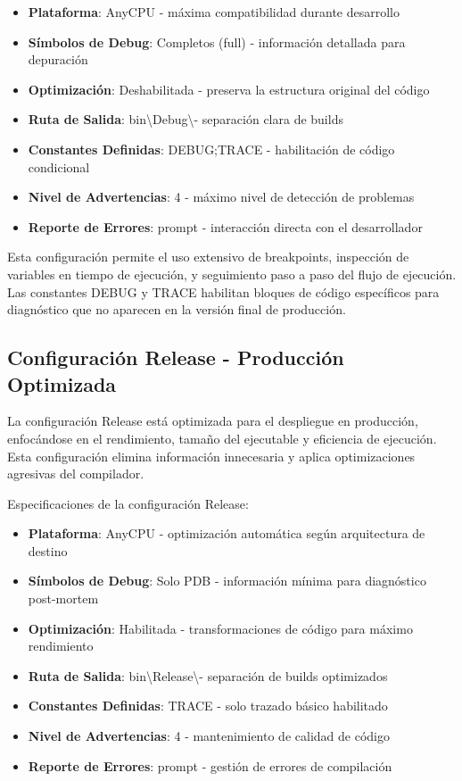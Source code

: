 \documentclass[a4paper]{article}
\begin{document}
\begin{itemize}
\item \textbf{Plataforma}: AnyCPU - máxima compatibilidad durante desarrollo
\item \textbf{Símbolos de Debug}: Completos (full) - información detallada para depuración
\item \textbf{Optimización}: Deshabilitada - preserva la estructura original del código
\item \textbf{Ruta de Salida}: bin\textbackslash Debug\textbackslash - separación clara de builds
\item \textbf{Constantes Definidas}: DEBUG;TRACE - habilitación de código condicional
\item \textbf{Nivel de Advertencias}: 4 - máximo nivel de detección de problemas
\item \textbf{Reporte de Errores}: prompt - interacción directa con el desarrollador
\end{itemize}

Esta configuración permite el uso extensivo de breakpoints, inspección de variables en tiempo de ejecución, y seguimiento paso a paso del flujo de ejecución. Las constantes DEBUG y TRACE habilitan bloques de código específicos para diagnóstico que no aparecen en la versión final de producción.

\subsection{Configuración Release - Producción Optimizada}

La configuración Release está optimizada para el despliegue en producción, enfocándose en el rendimiento, tamaño del ejecutable y eficiencia de ejecución. Esta configuración elimina información innecesaria y aplica optimizaciones agresivas del compilador.

Especificaciones de la configuración Release:

\begin{itemize}
\item \textbf{Plataforma}: AnyCPU - optimización automática según arquitectura de destino
\item \textbf{Símbolos de Debug}: Solo PDB - información mínima para diagnóstico post-mortem
\item \textbf{Optimización}: Habilitada - transformaciones de código para máximo rendimiento
\item \textbf{Ruta de Salida}: bin\textbackslash Release\textbackslash - separación de builds optimizados
\item \textbf{Constantes Definidas}: TRACE - solo trazado básico habilitado
\item \textbf{Nivel de Advertencias}: 4 - mantenimiento de calidad de código
\item \textbf{Reporte de Errores}: prompt - gestión de errores de compilación
\end{itemize}
\end{document}
